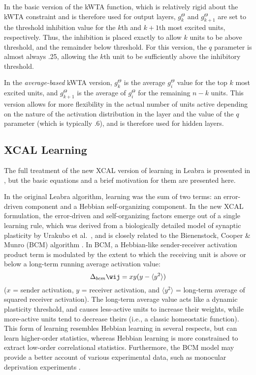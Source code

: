 In the basic version of the kWTA function, which is relatively rigid about the kWTA constraint and is therefore used for output layers, $g^{\Theta}_k$ and $g^{\Theta}_{k+1}$ are set to the threshold inhibition value for the $k$th and $k+1$th most excited units, respectively. Thus, the inhibition is placed exactly to allow $k$ units to be above threshold, and the remainder below threshold. For this version, the $q$ parameter is almost always .25, allowing the $k$th unit to be sufficiently above the inhibitory threshold.

In the {\em average-based} kWTA version, $g^{\Theta}_k$ is the average $g_i^{\Theta}$ value for the top $k$ most excited units, and $g^{\Theta}_{k+1}$ is the average of $g_i^{\Theta}$ for the remaining $n-k$ units. This version allows for more flexibility in the actual number of units active depending on the nature of the activation distribution in the layer and the value of the $q$ parameter (which is typically .6), and is therefore used for hidden layers.

\subsection{XCAL Learning} 

The full treatment of the new XCAL version of learning in Leabra is presented in , but the basic equations and a brief motivation for them are presented here.

In the original Leabra algorithm, learning was the sum of two terms: an error-driven component and a Hebbian self-organizing component. In the new XCAL formulation, the error-driven and self-organizing factors emerge out of a single learning rule, which was derived from a biologically detailed model of synaptic plasticity by Urakubo et al.~\cite{UrakuboHondaFroemkeEtAl08}, and is closely related to the Bienenstock, Cooper \& Munro (BCM) algorithm \cite{BienenstockCooperMunro82}. In BCM, a Hebbian-like sender-receiver activation product term is modulated by the extent to which the receiving unit is above or below a long-term running average activation value:
\begin{equation}
 \Delta_{bcm} \wij = xy (y - \langle y^2 \rangle)
 \label{eq:bcm}
\end{equation}
($x$ = sender activation, $y$ = receiver activation, and $\langle y^2 \rangle$ = long-term average of squared receiver activation). The long-term average value acts like a dynamic plasticity threshold, and causes less-active units to increase their weights, while more-active units tend to decrease theirs (i.e., a classic homeostatic function). This form of learning resembles Hebbian learning in several respects, but can learn higher-order statistics, whereas Hebbian learning is more constrained to extract low-order correlational statistics. Furthermore, the BCM model may provide a better account of various experimental data, such as monocular deprivation experiments \cite{CooperIntratorBlaisEtAl04}.

